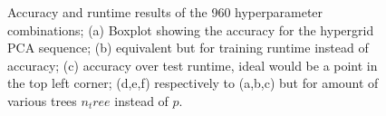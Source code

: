 \documentclass[conference]{IEEEtran}
\begin{document}
\begin{figure}[ht!]
    \quad
    \quad
    \quad

    \caption{
        \color{til}
        Accuracy and runtime results of the 960 hyperparameter combinations; (a) Boxplot showing the accuracy for the hypergrid PCA sequence; (b) equivalent but for training runtime instead of accuracy; (c) accuracy over test runtime, ideal would be a point in the top left corner; (d,e,f) respectively to (a,b,c) but for amount of various trees $n_tree$ instead of $p$.
    }
    \label{fig:hyper:pca}
\end{figure}
\end{document}
